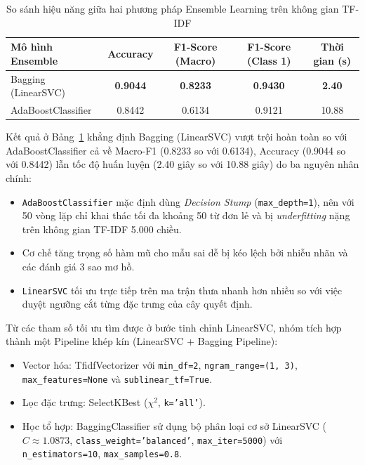 \begin{table}[H]
\centering
\begin{tabular}{|l|c|c|c|c|}
\hline
\textbf{Mô hình Ensemble} & \textbf{Accuracy} & \textbf{F1-Score (Macro)} & \textbf{F1-Score (Class 1)} & \textbf{Thời gian (s)} \\ \hline
Bagging (LinearSVC) & \textbf{0.9044} & \textbf{0.8233} & \textbf{0.9430} & \textbf{2.40} \\ \hline
AdaBoostClassifier & 0.8442 & 0.6134 & 0.9121 & 10.88 \\ \hline
\end{tabular}
\caption{So sánh hiệu năng giữa hai phương pháp Ensemble Learning trên không gian TF-IDF}
\label{tab:ensemble_eval}
\end{table}

Kết quả ở Bảng~\ref{tab:ensemble_eval} khẳng định Bagging (LinearSVC) vượt trội hoàn toàn so với AdaBoostClassifier cả về Macro-F1 (0.8233 so với 0.6134), Accuracy (0.9044 so với 0.8442) lẫn tốc độ huấn luyện (2.40 giây so với 10.88 giây) do ba nguyên nhân chính:
\begin{itemize}
    \item \texttt{AdaBoostClassifier} mặc định dùng \textit{Decision Stump} (\texttt{max\_depth=1}), nên với 50 vòng lặp chỉ khai thác tối đa khoảng 50 từ đơn lẻ và bị \textit{underfitting} nặng trên không gian TF-IDF 5.000 chiều.
    \item Cơ chế tăng trọng số hàm mũ cho mẫu sai dễ bị kéo lệch bởi nhiễu nhãn và các đánh giá 3 sao mơ hồ.
    \item \texttt{LinearSVC} tối ưu trực tiếp trên ma trận thưa nhanh hơn nhiều so với việc duyệt ngưỡng cắt từng đặc trưng của cây quyết định.
\end{itemize}

Từ các tham số tối ưu tìm được ở bước tinh chỉnh LinearSVC, nhóm tích hợp thành một Pipeline khép kín (LinearSVC + Bagging Pipeline):
\begin{itemize}
    \item Vector hóa: TfidfVectorizer với \texttt{min\_df=2}, \texttt{ngram\_range=(1, 3)}, \texttt{max\_features=None} và \texttt{sublinear\_tf=True}.
    \item Lọc đặc trưng: SelectKBest ($\chi^2$, \texttt{k='all'}).
    \item Học tổ hợp: BaggingClassifier sử dụng bộ phân loại cơ sở LinearSVC ($C \approx 1.0873$, \texttt{class\_weight=\allowbreak'balanced'}, \texttt{max\_iter=5000}) với \texttt{n\_estimators=10}, \texttt{max\_samples=0.8}.
\end{itemize}

